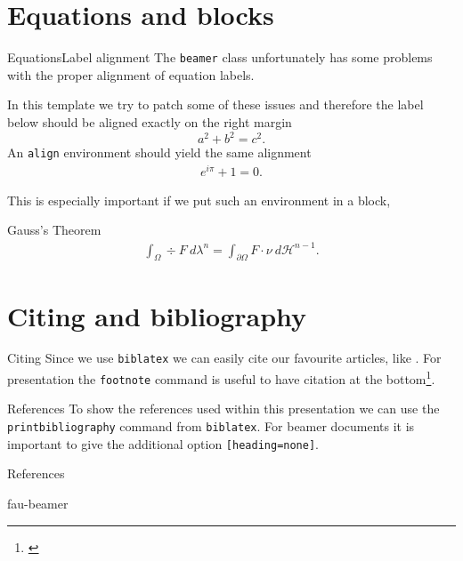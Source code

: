 \documentclass[final]{beamer}
\begin{document}
\section{Equations and blocks}
%
%
%
%
%
\begin{frame}{Equations}{Label alignment}
  The \texttt{beamer} class unfortunately has some problems with the proper
  alignment of equation labels.

  \pause
  In this template we try to patch some of these issues and therefore the label
  below should be aligned exactly on the right margin
  \begin{equation}\label{eq:pythagoras}
    a^2 + b^2 = c^2.
  \end{equation}
  An \texttt{align} environment should yield the same alignment
  \begin{align}\label{eq:euler}
    e^{i\pi} +1= 0.
  \end{align}

  This is especially important if we put such an environment in a block,

  \begin{block}{Gauss's Theorem}
    \begin{align}\label{eq:gauss}
      \int_\Omega \div F\ d\lambda^n = \int_{\partial\Omega} F\cdot
      \nu\ d\mathcal{H}^{n-1}.
    \end{align}
  \end{block}
\end{frame}
\section{Citing and bibliography}
%
%
%
%
%
\begin{frame}{Citing}
  Since we use \texttt{biblatex} we can easily cite our favourite articles, like
  \cite{bungert2021bregman, bungert2021neural}. For presentation the
  \texttt{footnote} command is useful to have citation at the
  bottom\footnote{\cite{bungert2021bregman}}.
\end{frame}
%
%
%
%
%
\begin{frame}{References}
  To show the references used within this presentation we can use the
  \texttt{printbibliography} command from \texttt{biblatex}. For
  beamer documents it is important to give the additional option
  \texttt{[heading=none]}.
  \begin{block}{References}
    \printbibliography[heading=none]
  \end{block}
\end{frame}
%
%
%
%
%
\begin{frame}{fau-beamer}
\end{frame}
\end{document}
